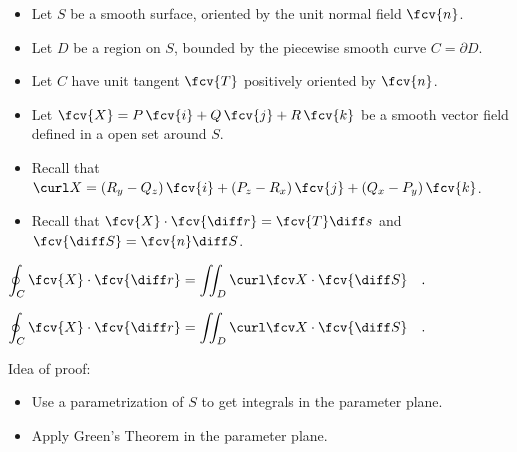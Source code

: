 \begin{frame}
\begin{itemize}
\item Let $S$ be a smooth surface, oriented by the unit normal field $\fcv{n}$. 
\item Let $D$ be a region on $S$, bounded by the piecewise smooth curve $C=\partial D$. 
\item Let $C$ have unit tangent $\fcv{T}$ positively oriented by $\fcv{n}$. 
\item Let $\fcv{X}=P \, \fcv{i} + Q\, \fcv{j} + R\, \fcv{k}$ be a smooth vector field defined in a open set around $S$.
\item Recall that $\curl X = \left(R_y - Q_z\right)  \fcv{i} +  \left(P_z - R_x\right)  \fcv{j} + \left(Q_x - P_y\right)  \fcv{k} $.
\item Recall that $\fcv{X}\cdot \fcv{\diff r} = \fcv{T}\diff s$ and $\fcv{\diff S} = \fcv{n}  \diff S$.
\end{itemize}
\begin{theorem}[Stokes]
$\displaystyle \oint_C \fcv{X} \cdot \fcv{\diff r} = \iint_D \curl \fcv X \cdot \fcv{\diff S}\quad .$
\end{theorem}



\end{frame}

\begin{frame}
\begin{theorem}[Stokes]
$\displaystyle \oint_C \fcv{X} \cdot \fcv{\diff r} = \iint_D \curl \fcv X \cdot \fcv{\diff S}\quad .$
\end{theorem}
Idea of proof:
\begin{itemize}
\item Use a parametrization of $S$ to get integrals in the parameter plane.
\item Apply Green's Theorem in the parameter plane.
\end{itemize}

\end{frame}